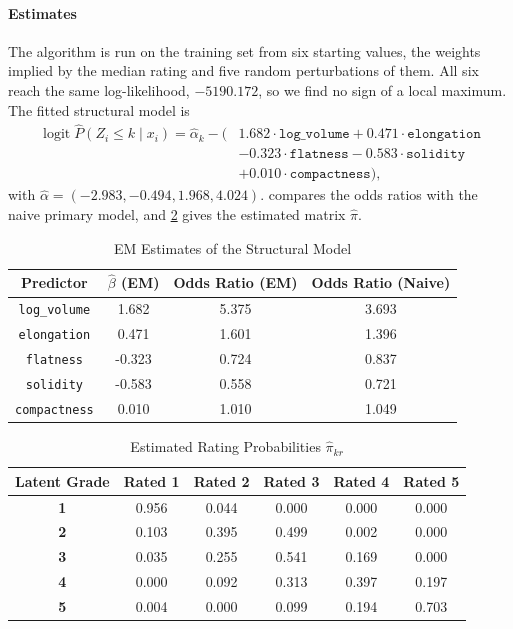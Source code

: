 \documentclass[12pt]{article}
\begin{document}
\paragraph{Estimates}
The algorithm is run on the training set from six starting values, the
weights implied by the median rating and five random perturbations of
them. All six reach the same log-likelihood, $-5190.172$, so we find no
sign of a local maximum. The fitted structural model is
\begin{align*}
  \operatorname{logit} \hat{P}(Z_i \le k \mid x_i) = \hat{\alpha}_k
  - \bigl(&1.682\cdot\texttt{log\_volume}
    + 0.471\cdot\texttt{elongation} \\
    &- 0.323\cdot\texttt{flatness}
    - 0.583\cdot\texttt{solidity} \\
  &+ 0.010\cdot\texttt{compactness}\bigr),
\end{align*}
with $\hat{\alpha} = (-2.983, -0.494, 1.968, 4.024)$.
 compares the odds ratios with the naive primary
model, and \cref{table:em_pi} gives the estimated matrix $\hat{\pi}$.

\begin{table}[H]
  \centering
  \begin{tabular}{|| c | c | c | c ||}
    \hline
    \textbf{Predictor}
    & $\hat{\beta}$ \textbf{(EM)}
    & \textbf{Odds Ratio (EM)}
    & \textbf{Odds Ratio (Naive)} \\[0.5ex]
    \hline\hline
    \texttt{log\_volume} & 1.682 & 5.375 & 3.693 \\
    \texttt{elongation} & 0.471 & 1.601 & 1.396 \\
    \texttt{flatness} & -0.323 & 0.724 & 0.837 \\
    \texttt{solidity} & -0.583 & 0.558 & 0.721 \\
    \texttt{compactness} & 0.010 & 1.010 & 1.049 \\
    \hline
  \end{tabular}
  \caption{EM Estimates of the Structural Model}
  \label{table:em_coef}
\end{table}

\begin{table}[H]
  \centering
  \begin{tabular}{|| c | c c c c c ||}
    \hline
    \textbf{Latent Grade} & \textbf{Rated 1} & \textbf{Rated 2}
    & \textbf{Rated 3} & \textbf{Rated 4} & \textbf{Rated 5} \\[0.5ex]
    \hline\hline
    \textbf{1} & 0.956 & 0.044 & 0.000 & 0.000 & 0.000 \\
    \textbf{2} & 0.103 & 0.395 & 0.499 & 0.002 & 0.000 \\
    \textbf{3} & 0.035 & 0.255 & 0.541 & 0.169 & 0.000 \\
    \textbf{4} & 0.000 & 0.092 & 0.313 & 0.397 & 0.197 \\
    \textbf{5} & 0.004 & 0.000 & 0.099 & 0.194 & 0.703 \\
    \hline
  \end{tabular}
  \caption{Estimated Rating Probabilities $\hat{\pi}_{kr}$}
  \label{table:em_pi}
\end{table}
\end{document}

